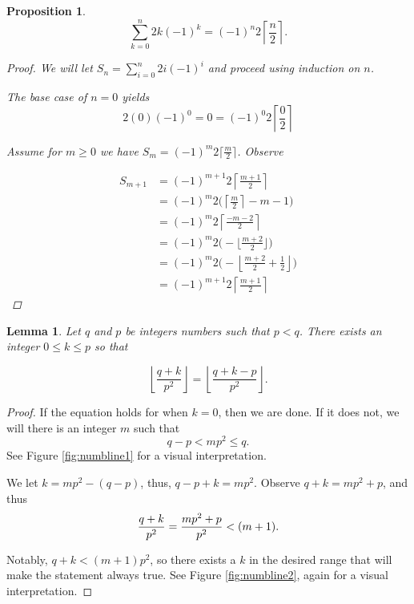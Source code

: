 \documentclass[11pt]{amsart}
\numberwithin{equation}{section}
\theoremstyle{plain}
\newtheorem{proposition}[equation]{Proposition}
\newtheorem{lemma}[equation]{Lemma}
\theoremstyle{definition}
\begin{document}
\begin{proposition}\label{prop:alt_even}
$$\sum_{k=0}^n 2k(-1)^k=(-1)^n2\left\lceil{\frac{n}{2}}\right\rceil.$$
\begin{proof}
We will let $\displaystyle S_n = \sum_{i=0}^n 2i(-1)^i$ and proceed using induction on $n$.

The base case of $n = 0$ yields $$2(0)(-1)^0 = 0= (-1)^0 2\left\lceil \frac{0}{2}\right\rceil $$

Assume for $ m \geq 0$ we have  $S_m = (-1)^m2\lceil{\frac{m}{2}}\rceil$. Observe 


\begin{align*}
S_{m+1} &= (-1)^{m+1} 2 \left\lceil \frac{m+1}{2} \right\rceil \\
&=(-1)^m 2\bigl(\left\lceil \tfrac{m}{2}\right\rceil - m - 1\bigr) \\
&= (-1)^m 2\left\lceil \frac{-m-2}{2} \right\rceil \\
&= (-1)^m 2\bigl(-\lfloor \tfrac{m+2}{2}\rfloor\bigr) \\
&= (-1)^m 2\bigl(-\left\lfloor \tfrac{m+2}{2}+\tfrac{1}{2}\right\rfloor\bigr) \\
&= (-1)^{m+1} 2\left\lceil \frac{m+1}{2}\right\rceil
\end{align*}
\end{proof}

\end{proposition}


\begin{lemma}\label{lemma:qpk} Let $q$ and $p$ be integers numbers such that $p<q$. 
There exists an integer $0\leq k\leq p$ so that

$$\left\lfloor\frac{q+k}{p^2}\right\rfloor = \left\lfloor\frac{q+k-p}{p^2}\right\rfloor.$$

\end{lemma}
\begin{proof}
If the equation holds for when $k=0$, then we are done. If it does not, we will there is an integer $m$ such that
$$q-p < mp^2 \leq q.$$ See Figure \ref{fig:numbline1} for a visual interpretation.

We let $k=mp^2-(q-p)$, thus, $q-p+k=mp^2$.
Observe $q+k=mp^2+p$, and thus
\[{q+k\over p^2}={mp^2+p\over p^2}<(m+1).\] 


Notably, $q+k<(m+1)p^2$, so there exists a $k$ in the desired range that will make the statement always true. See Figure \ref{fig:numbline2}, again for a visual interpretation.
\end{proof}
\end{document}
